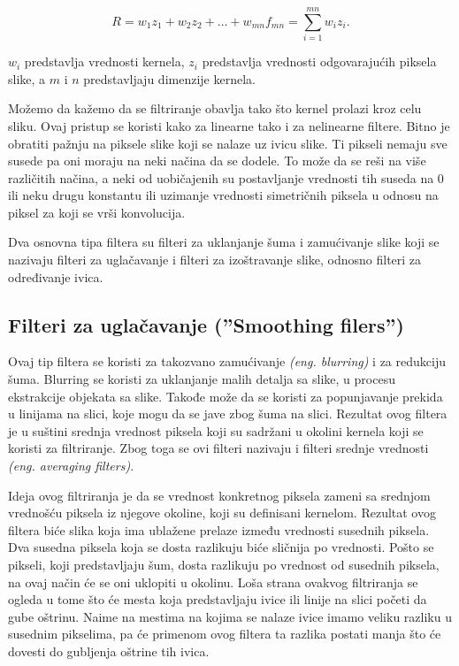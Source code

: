 \documentclass[a4paper,12pt,titlepage]{article}
\begin{document}
\begin{equation}\label{eq:conv5}
R = w_{1}z_{1} + w_{2}z_{2} + \dots + w_{mn}f_{mn} = \sum_{i = 1}^{mn} w_{i}z_{i}.
\end{equation}

$w_{i}$ predstavlja vrednosti kernela, $z_{i}$ predstavlja vrednosti odgovarajućih piksela slike, a $m$ i $n$ predstavljaju dimenzije kernela.

Možemo da kažemo da se filtriranje obavlja tako što kernel prolazi kroz celu sliku. Ovaj pristup se koristi kako za linearne tako i za nelinearne filtere. Bitno je obratiti pažnju na piksele slike koji se nalaze uz ivicu slike. Ti pikseli nemaju sve susede pa oni moraju na neki načina da se dodele. To može da se reši na više različitih načina, a neki od uobičajenih su postavljanje vrednosti tih suseda na 0 ili neku drugu konstantu ili uzimanje vrednosti simetričnih piksela u odnosu na piksel za koji se vrši konvolucija. 

Dva osnovna tipa filtera su filteri za uklanjanje šuma i zamućivanje slike koji se nazivaju filteri za uglačavanje i filteri za izoštravanje slike, odnosno filteri za određivanje ivica.

\subsection{Filteri za uglačavanje (''Smoothing filers'')}\label{3.2}%

Ovaj tip filtera se koristi za takozvano zamućivanje \emph{(eng. blurring)} i za redukciju šuma. Blurring se koristi za uklanjanje malih detalja sa slike, u procesu ekstrakcije objekata sa slike. Takođe može da se koristi za popunjavanje prekida u linijama na slici, koje mogu da se jave zbog šuma na slici. Rezultat ovog filtera je u suštini srednja vrednost piksela koji su sadržani u okolini kernela koji se koristi za filtriranje. Zbog toga se ovi filteri nazivaju i filteri srednje vrednosti \emph{(eng. averaging filters)}. 

Ideja ovog filtriranja je da se vrednost konkretnog piksela zameni sa srednjom vrednošću piksela iz njegove okoline, koji su definisani kernelom. Rezultat ovog filtera biće slika koja ima ublažene prelaze između vrednosti susednih piksela. Dva susedna piksela koja se dosta razlikuju biće sličnija po vrednosti. Pošto se pikseli, koji predstavljaju šum, dosta razlikuju po vrednost od susednih piksela, na ovaj način će se oni uklopiti u okolinu. Loša strana ovakvog filtriranja se ogleda u tome što će mesta koja predstavljaju ivice ili linije na slici početi da gube oštrinu. Naime na mestima na kojima se nalaze ivice imamo veliku razliku u susednim pikselima, pa će primenom ovog filtera ta razlika postati manja što će dovesti do gubljenja oštrine tih ivica.
\end{document}
